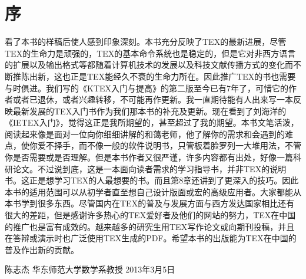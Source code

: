 \documentclass[UTF8]{ctexart}
\begin{document}
\section{序}%
\label{sec:序}

看了本书的样稿后使人感到印象深刻。本书充分反映了TEX的最新进展，尽管TEX的生命力是顽强的，TEX的基本命令系统也是稳定的，但是它对非西方语言的扩展以及输出格式等都随着计算机技术的发展以及科技文献传播方式的变化而不断推陈出新，这也正是TEX能经久不衰的生命力所在。因此推广TEX的书也需要与时俱进。我们写的《KTEX入门与提高》的第二版至今已有7年了，可惜它的作者或者已退休，或者兴趣转移，不可能再作更新。我一直期待能有人出来写一本反映最新发展的TEX入门书作为我们那本书的补充及更新。现在看到了刘海洋的《IETEX入门》，觉得这正是我所期望的，甚至超过了我的期望。本书文笔活泼，阅读起来像是面对一位向你细细讲解的和蔼老师，他了解你的需求和会遇到的难点，使你爱不择手，而不像一般的软件说明书，只管板着脸罗列一大堆用法，不管你是否需要或是否理解。但是本书作者又很严谨，许多内容都有出处，好像一篇科研论文。不过说到底，这是一本面向读者需求的学习指导书，并非TEX的说明书。这正是想学习TEX的人最想要的书。而且第8章还讲到了更深入的技巧。因此本书的适用范围可以从初学者直至想自己设计版面或宏的高级应用者。大家都能从本书学到很多东西。尽管国内在TEX的普及与发展方面与西方发达国家相比还有很大的差距，但是感谢许多热心的TEX爱好者及他们的网站的努力，TEX在中国的推广也是富有成效的。越来越多的研究生用TEX写作论文或向期刊投稿，并且在答辩或演示时也广泛使用TEX生成的PDF。希望本书的出版能为TEX在中国的普及作出新的贡献。

陈志杰
华东师范大学数学系教授
2013年3月5日
\end{document}
